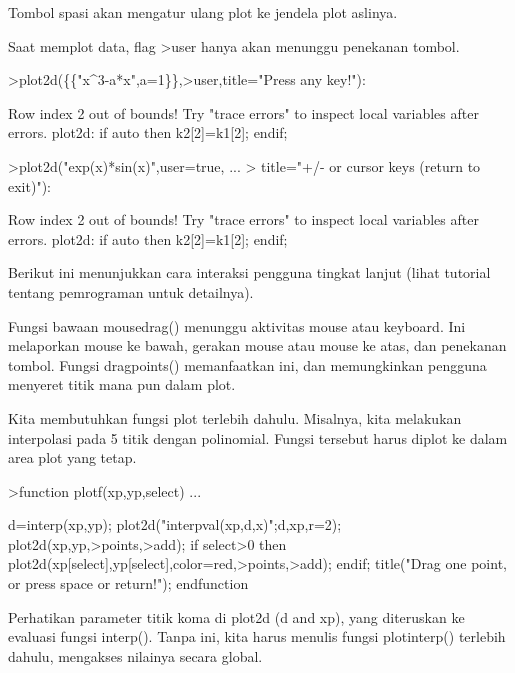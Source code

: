 \begin{eulernotebook}
\begin{eulercomment}
Tombol spasi akan mengatur ulang plot ke jendela plot aslinya.

Saat memplot data, flag \textgreater{}user hanya akan menunggu penekanan tombol.
\end{eulercomment}
\begin{eulerprompt}
>plot2d(\{\{"x^3-a*x",a=1\}\},>user,title="Press any key!"):
\end{eulerprompt}
\begin{euleroutput}
  Row index 2 out of bounds!
  Try "trace errors" to inspect local variables after errors.
  plot2d:
      if auto then k2[2]=k1[2]; endif;
\end{euleroutput}
\begin{eulerprompt}
>plot2d("exp(x)*sin(x)",user=true, ...
>  title="+/- or cursor keys (return to exit)"):
\end{eulerprompt}
\begin{euleroutput}
  Row index 2 out of bounds!
  Try "trace errors" to inspect local variables after errors.
  plot2d:
      if auto then k2[2]=k1[2]; endif;
\end{euleroutput}
\begin{eulercomment}
Berikut ini menunjukkan cara interaksi pengguna tingkat lanjut (lihat
tutorial tentang pemrograman untuk detailnya).

Fungsi bawaan mousedrag() menunggu aktivitas mouse atau keyboard. Ini
melaporkan mouse ke bawah, gerakan mouse atau mouse ke atas, dan
penekanan tombol. Fungsi dragpoints() memanfaatkan ini, dan
memungkinkan pengguna menyeret titik mana pun dalam plot.

Kita membutuhkan fungsi plot terlebih dahulu. Misalnya, kita melakukan
interpolasi pada 5 titik dengan polinomial. Fungsi tersebut harus
diplot ke dalam area plot yang tetap.
\end{eulercomment}
\begin{eulerprompt}
>function plotf(xp,yp,select) ...
\end{eulerprompt}
\begin{eulerudf}
    d=interp(xp,yp);
    plot2d("interpval(xp,d,x)";d,xp,r=2);
    plot2d(xp,yp,>points,>add);
    if select>0 then
      plot2d(xp[select],yp[select],color=red,>points,>add);
    endif;
    title("Drag one point, or press space or return!");
  endfunction
\end{eulerudf}
\begin{eulercomment}
Perhatikan parameter titik koma di  plot2d (d and xp), yang diteruskan
ke evaluasi fungsi interp(). Tanpa ini, kita harus menulis fungsi
plotinterp() terlebih dahulu, mengakses nilainya secara global.


\end{eulercomment}
\end{eulernotebook}
